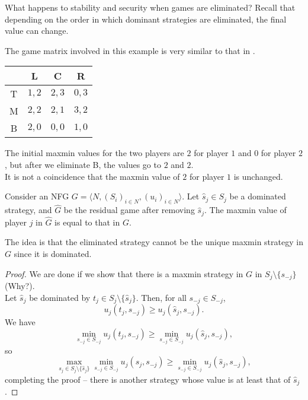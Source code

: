 	What happens to stability and security when games are eliminated? Recall that depending on the order in which dominant strategies are eliminated, the final value can change.

	\begin{fex}
		The game matrix involved in this example is very similar to that in .
		\begin{center}
		\begin{tabular}{|c||c|c|c|}
			\hline
			& \textsf{L} & \textsf{C} & \textsf{R} \\
			\hline\hline
			\textsf{T} & $1,2$ & $2,3$ & $0,3$ \\
			\hline
			\textsf{M} & $2,2$ & $2,1$ & $3,2$ \\
			\hline
			\textsf{B} & $2,0$ & $0,0$ & $1,0$ \\ \hline
		\end{tabular}
		\end{center}
		The initial maxmin values for the two players are $2$ for player $1$ and $0$ for player $2$, but after we eliminate \textsf{B}, the values go to $2$ and $2$.\\
		It is not a coincidence that the maxmin value of $2$ for player $1$ is unchanged.
	\end{fex}

	\begin{ftheo}
		Consider an NFG $G = \langle N , (S_i)_{i \in N} , (u_i)_{i \in N}\rangle$. Let $\hat{s}_j \in S_j$ be a dominated strategy, and $\hat{G}$ be the residual game after removing $\hat{s}_j$. The maxmin value of player $j$ in $\hat{G}$ is equal to that in $G$.
	\end{ftheo}

	The idea is that the eliminated strategy cannot be the unique maxmin strategy in $G$ since it is dominated.

	\begin{proof}
		We are done if we show that there is a maxmin strategy in $G$ in $S_{j} \setminus \{s_{-j}\}$ (Why?).\\
		Let $\hat{s}_j$ be dominated by $t_j \in S_j \setminus \{\hat{s}_j\}$. Then, for all $s_{-j} \in S_{-j}$,
		\[ u_j(t_j,s_{-j}) \ge u_j(\hat{s}_j,s_{-j}). \]
		We have
		\[ \min_{s_{-j} \in S_{-j}} u_j(t_j,s_{-j}) \ge \min_{s_{-j} \in S_{-j}} u_j(\hat{s}_j,s_{-j}), \]
		so
		\[ \max_{s_j \in S_{j} \setminus \{\hat{s}_j\}} \min_{s_{-j} \in S_{-j}} u_j(s_j,s_{-j}) \ge \min_{s_{-j} \in S_{-j}} u_j(\hat{s}_j,s_{-j}), \]
		completing the proof -- there is another strategy whose value is at least that of $\hat{s}_j$.
	\end{proof}

